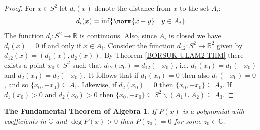 \documentclass[11pt, letterpaper, oneside]{report}
\theoremstyle{pplain}
\newtheorem{FUNDALGTHM}[theorem]{The Fundamental Theorem of Algebra}
\theoremstyle{ddefinition}
\theoremstyle{nnn}
\theoremstyle{eexercise}
\newcommand{\R}{{\mathbb R}}
\newcommand{\C}{{\mathbb C}}
\newcommand{\ssmin}{\smallsetminus}
\begin{document}
\begin{proof}
For $x\in S^{2}$ let $d_{i}(x)$ denote the distance from  $x$ to the set $A_{i}$: 
$$d_{i}(x) = \inf\{ \norm{x-y} \ | \ y\in A_{i} \}$$
The function $d_{i}\colon S^{2} \to \R$  is continuous. Also, since $A_{i}$ is closed we have 
$d_{i}(x) = 0$ if and only if $x\in A_{i}$. Consider the function $d_{12} \colon S^{2}\to \R^{2}$ given by 
$d_{12}(x) = (d_{1}(x), d_{2}(x))$. By Theorem  \ref{BORSUK-ULAM2 THM} there exists a point 
$x_{0}\in S^{2}$ such that $d_{12}(x_{0}) = d_{12}(-x_{0})$, i.e. $d_{1}(x_{0}) = d_{1}(-x_{0})$ and 
$d_{2}(x_{0}) = d_{2}(-x_{0})$.  It follows that if $d_{1}(x_{0}) = 0$ then also 
$d_{1}(-x_{0}) = 0$, and so $\{x_{0}, -x_{0}\} \subseteq A_{1}$. Likewise, 
if $d_{2}(x_{0}) = 0$ then $\{x_{0}, -x_{0}\} \subseteq A_{2}$. If $d_{1}(x_{0})>0$ and $d_{2}(x_{0}) > 0$
then $\{x_{0}, -x_{0}\} \subseteq  S^{2}\ssmin (A_{1}\cup A_{2}) \subseteq A_{3}$.   
\end{proof}


\begin{FUNDALGTHM}
\label{FUND ALG THM}
If $P(x)$ is a polynomial with coefficients in $\C$ and $\deg P(x) > 0$ then $P(z_{0}) = 0$ for some 
$z_{0} \in \C$. 
\end{FUNDALGTHM}
\end{document}
